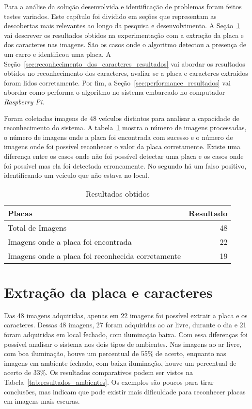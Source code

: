 Para a análise da solução desenvolvida e identificação de problemas foram feitos
testes variados. Este capítulo foi dividido em seções que representam as
descobertas mais relevantes ao longo da pesquisa e desenvolvimento. A
Seção~\ref{sec:extracao_da_placa_resultados} vai descrever os resultados obtidos
na experimentação com a extração da placa e dos caracteres nas imagens. São os casos
onde o algoritmo detectou a presença de um carro e identificou uma placa. A
Seção~\ref{sec:reconhecimento_dos_caracteres_resultados} vai abordar os
resultados obtidos no reconhecimento dos caracteres, avaliar se a placa e caracteres
extraídos foram lidos corretamente. Por fim, a
Seção~\ref{sec:performance_resultados} vai abordar como performa o algoritmo no
sistema embarcado no computador \emph{Raspberry Pi}.

Foram coletadas imagens de 48 veículos distintos para analisar a capacidade de
reconhecimento do sistema. A tabela~\ref{tab:resultados} mostra o número de
imagens processadas, o número de imagens onde a placa foi encontrada com sucesso
e o número de imagens onde foi possível reconhecer o valor da placa corretamente.
Existe uma diferença entre os casos onde não foi possível detectar uma placa e os
casos onde foi possível mas ela foi detectada erroneamente. No segundo há um falso
positivo, identificando um veículo que não estava no local.

\begin{table}[]
\centering
\caption{Resultados obtidos}
\label{tab:resultados}
\begin{tabular}{@{}lr@{}}
\toprule
Placas                               & \multicolumn{1}{l}{Resultado} \\ \midrule
Total de Imagens                     & 48                           \\
Imagens onde a placa foi encontrada  & 22                            \\
Imagens onde a placa foi reconhecida corretamente & 19
\end{tabular}
\end{table}

\section{Extração da placa e caracteres}
\label{sec:extracao_da_placa_resultados}

Das 48 imagens adquiridas, apenas em 22 imagens foi possível extrair a placa e os caracteres. Dessas 48 imagens, 27 foram adquiridas ao ar livre, durante o dia e 21 foram adquiridas em local fechado, com iluminação baixa. Com essa diferenças foi possível analisar o sistema nos dois tipos de ambientes. Nas imagens ao ar livre, com boa iluminação, houve um percentual de 55\% de acerto, enquanto nas imagens em ambiente fechado, com baixa iluminação, houve um percentual de acerto de 33\%. Os resultados comparativos podem ser vistos na Tabela~\ref{tab:resultados_ambientes}. Os exemplos são poucos para tirar conclusões, mas indicam que pode existir mais dificuldade para reconhecer placas em imagens mais escuras.

